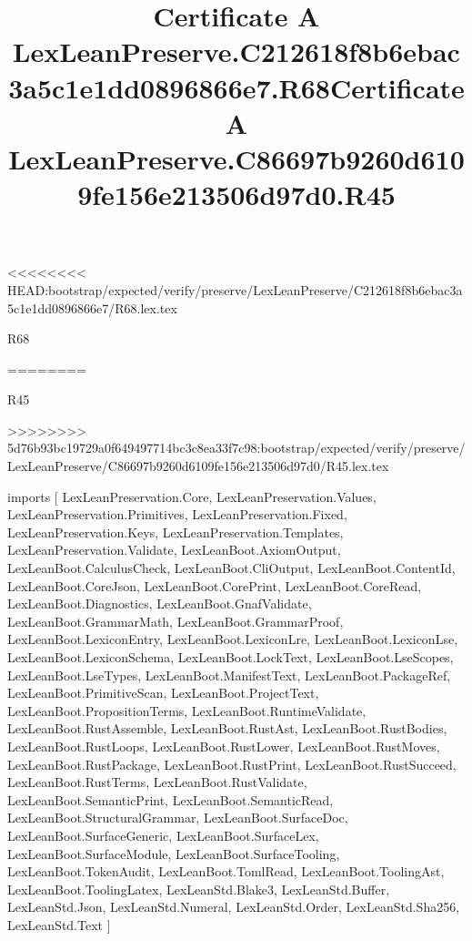 <<<<<<<< HEAD:bootstrap/expected/verify/preserve/LexLeanPreserve/C212618f8b6ebac3a5c1e1dd0896866e7/R68.lex.tex
\begin{lexlean}{R68}
\title{Certificate A LexLeanPreserve.C212618f8b6ebac3a5c1e1dd0896866e7.R68}
========
\begin{lexlean}{R45}
\title{Certificate A LexLeanPreserve.C86697b9260d6109fe156e213506d97d0.R45}
>>>>>>>> 5d76b93bc19729a0f649497714bc3c8ea33f7c98:bootstrap/expected/verify/preserve/LexLeanPreserve/C86697b9260d6109fe156e213506d97d0/R45.lex.tex
\begin{coremodule}
imports [
  LexLeanPreservation.Core,
  LexLeanPreservation.Values,
  LexLeanPreservation.Primitives,
  LexLeanPreservation.Fixed,
  LexLeanPreservation.Keys,
  LexLeanPreservation.Templates,
  LexLeanPreservation.Validate,
  LexLeanBoot.AxiomOutput,
  LexLeanBoot.CalculusCheck,
  LexLeanBoot.CliOutput,
  LexLeanBoot.ContentId,
  LexLeanBoot.CoreJson,
  LexLeanBoot.CorePrint,
  LexLeanBoot.CoreRead,
  LexLeanBoot.Diagnostics,
  LexLeanBoot.GnafValidate,
  LexLeanBoot.GrammarMath,
  LexLeanBoot.GrammarProof,
  LexLeanBoot.LexiconEntry,
  LexLeanBoot.LexiconLre,
  LexLeanBoot.LexiconLse,
  LexLeanBoot.LexiconSchema,
  LexLeanBoot.LockText,
  LexLeanBoot.LseScopes,
  LexLeanBoot.LseTypes,
  LexLeanBoot.ManifestText,
  LexLeanBoot.PackageRef,
  LexLeanBoot.PrimitiveScan,
  LexLeanBoot.ProjectText,
  LexLeanBoot.PropositionTerms,
  LexLeanBoot.RuntimeValidate,
  LexLeanBoot.RustAssemble,
  LexLeanBoot.RustAst,
  LexLeanBoot.RustBodies,
  LexLeanBoot.RustLoops,
  LexLeanBoot.RustLower,
  LexLeanBoot.RustMoves,
  LexLeanBoot.RustPackage,
  LexLeanBoot.RustPrint,
  LexLeanBoot.RustSucceed,
  LexLeanBoot.RustTerms,
  LexLeanBoot.RustValidate,
  LexLeanBoot.SemanticPrint,
  LexLeanBoot.SemanticRead,
  LexLeanBoot.StructuralGrammar,
  LexLeanBoot.SurfaceDoc,
  LexLeanBoot.SurfaceGeneric,
  LexLeanBoot.SurfaceLex,
  LexLeanBoot.SurfaceModule,
  LexLeanBoot.SurfaceTooling,
  LexLeanBoot.TokenAudit,
  LexLeanBoot.TomlRead,
  LexLeanBoot.ToolingAst,
  LexLeanBoot.ToolingLatex,
  LexLeanStd.Blake3,
  LexLeanStd.Buffer,
  LexLeanStd.Json,
  LexLeanStd.Numeral,
  LexLeanStd.Order,
  LexLeanStd.Sha256,
  LexLeanStd.Text
]


\end{coremodule}
\end{lexlean}
\end{lexlean}

